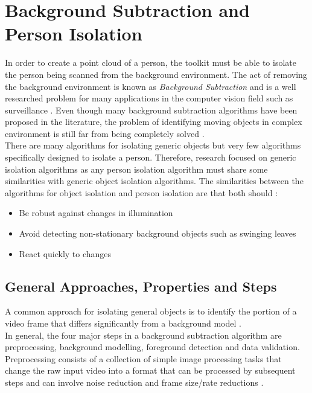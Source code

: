 \section{Background Subtraction and Person Isolation}
\label{background subtraction and person isolation}
In order to create a point cloud of a person, the toolkit must be able to isolate the person being scanned from the background environment. The act of removing the background environment is known as \emph{Background Subtraction} and is a well researched problem for many applications in the computer vision field such as surveillance \cite{McIvor2000}. Even though many background subtraction algorithms have been proposed in the literature, the problem of identifying moving objects in complex environment is still far from being completely solved \cite{Cheung2007}.\\

There are many algorithms for isolating generic objects but very few algorithms specifically designed to isolate a person. Therefore, research focused on generic isolation algorithms as any person isolation algorithm must share some similarities with generic object isolation algorithms. The similarities between the algorithms for object isolation and person isolation are that both should \cite{Cheung2007}:\begin{itemize}
  \item Be robust against changes in illumination
  \item Avoid detecting non-stationary background objects such as swinging leaves
  \item React quickly to changes
\end{itemize}

\subsection{General Approaches, Properties and Steps}
A common approach for isolating general objects is to identify the portion of a video frame that differs significantly from a background model \cite{Cheung2007}.\\

In general, the four major steps in a background subtraction algorithm are preprocessing, background modelling, foreground detection and data validation. Preprocessing consists of a collection of simple image processing tasks that change the raw input video into a format that can be processed by subsequent steps and can involve noise reduction and frame size/rate reductions \cite{Cheung2007}.\\

